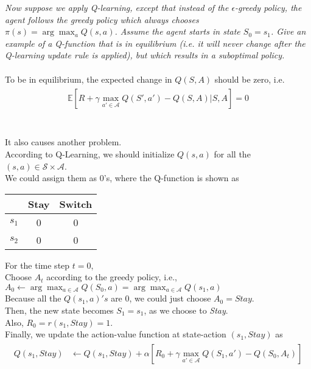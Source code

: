 \documentclass{myhw}
\begin{document}
\begin{homeworkProblem}
\begin{homeworkSection}
\end{homeworkSection}
\begin{homeworkSection}	
\emph{Now suppose we apply Q-learning, except that instead of the $\epsilon$-greedy policy, the agent follows the greedy policy which always chooses $\pi(s) = \arg \max_a Q(s,a)$. Assume the agent starts in state $S_0 = s_1$. Give an example of a Q-function that is in equilibrium (i.e. it will never change after the Q-learning update rule is applied), but which results in a suboptimal policy.} \\
\\
To be in equilibrium, the expected change in $Q(S, A)$ should be zero, i.e.
\begin{gather*}
\begin{aligned}
\mathbb{E} [R + \gamma \max_{a'\in\mathcal{A}} Q(S',a') - Q(S,A)|S,A] = 0
\end{aligned}
\end{gather*}
\\
\\
It also causes another problem. \\
According to Q-Learning, we should initialize $Q(s,a)$ for all the $(s,a) \in \mathcal{S} \times \mathcal{A}$. \\
We could assign them as 0's, where the Q-function is shown as 
\begin{center}
\begin{tabular}{c|c|c}
  & Stay & Switch \\ 
 \hline
 $s_1$ & 0 & 0 \\  
 \hline
 $s_2$ & 0 & 0    
\end{tabular} 
\end{center} 
For the time step $t=0$, \\
Choose $A_t$ according to the greedy policy, i.e., 
$A_0 \leftarrow \arg\max_{a\in\mathcal{A}}Q(S_0, a)=\arg\max_{a\in\mathcal{A}}Q(s_1, a)$ \\
Because all the $Q(s_1,a)'s$ are 0, we could just choose $A_0 = Stay$. \\
Then, the new state becomes $S_1=s_1$, as we choose to \emph{Stay}. \\
Also, $R_0 = r(s_1,Stay)=1$. \\
Finally, we update the action-value function at state-action $(s_1,Stay)$ as 
\begin{gather*}
\begin{aligned}
Q(s_1,Stay) &\leftarrow Q(s_1,Stay) + \alpha [R_0 + \gamma \max_{a'\in\mathcal{A}}Q(S_1,a')-Q(S_0,A_t)] \\

\end{aligned}
\end{gather*}
\end{homeworkSection}
\end{homeworkProblem}
\end{document}
